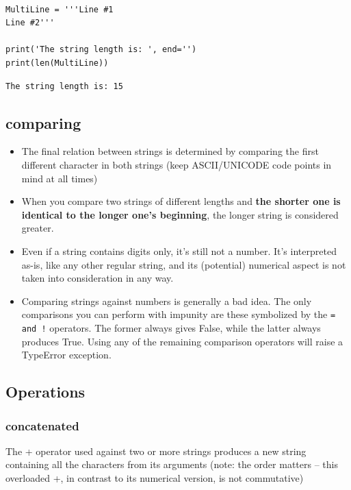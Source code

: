 \documentclass[11pt]{article}
\begin{document}
\begin{verbatim}

MultiLine = '''Line #1
Line #2'''

print('The string length is: ', end='')
print(len(MultiLine))

\end{verbatim}

\begin{verbatim}
The string length is: 15
\end{verbatim}

\subsection{comparing}
\label{sec:org0bdb181}
\begin{itemize}
\item The final relation between strings is determined by comparing the
first different character in both strings (keep ASCII/UNICODE code
points in mind at all times)
\item When you compare two strings of different lengths and \textbf{the shorter
one is identical to the longer one’s beginning}, the longer string is
considered greater.
\item Even if a string contains digits only, it’s still not a number. It’s
interpreted as-is, like any other regular string, and its
(potential) numerical aspect is not taken into consideration in any
way.
\item Comparing strings against numbers is generally a bad idea. The only
comparisons you can perform with impunity are these symbolized by
the \texttt{= and !} operators. The former always gives False, while the
latter always produces True. Using any of the remaining comparison
operators will raise a TypeError exception.
\end{itemize}

\newpage
\subsection{Operations}
\label{sec:org35cb361}
\subsubsection{concatenated}
\label{sec:orgc658bb8}
The + operator used against two or more strings produces a new string
containing all the characters from its arguments (note: the order
matters – this overloaded +, in contrast to its numerical version,
is not commutative)
\end{document}

